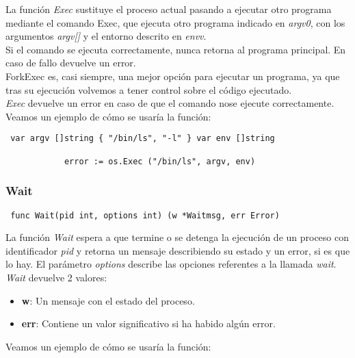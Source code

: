		La función \textit{Exec} sustituye el proceso actual pasando a ejecutar
		otro programa mediante el comando Exec, que ejecuta otro programa
		indicado en \textit{argv0}, con los argumentos \textit{argv[]} y el
		entorno descrito en \textit{envv}.\\
		
		Si el comando se ejecuta correctamente, nunca retorna al programa
		principal. En caso de fallo devuelve un error.\\
		
		ForkExec es, casi siempre, una mejor opción para ejecutar un programa,
		ya que tras su ejecución volvemos a tener control sobre el código
		ejecutado.\\
		
		\textit{Exec} devuelve un error en caso de que el comando nose ejecute
		correctamente.\\
		
		Veamos un ejemplo de cómo se usaría la función:
		
		\begin{verbatim} var argv []string { "/bin/ls", "-l" } var env []string
		
			error := os.Exec ("/bin/ls", argv, env) \end{verbatim}
		
		\subsubsection{Wait}

		\begin{verbatim} func Wait(pid int, options int) (w *Waitmsg, err Error)
		\end{verbatim}
				
		La función \textit{Wait} espera a que termine o se detenga la ejecución
		de un proceso con identificador \textit{pid} y retorna un mensaje
		describiendo su estado y un error, si es que lo hay. El parámetro
		\textit{options} describe las opciones referentes a la llamada
		\textit{wait}.\\
		
		\textit{Wait} devuelve 2 valores: \begin{itemize} \item \textbf{w}: Un
		mensaje con el estado del proceso.  \item \textbf{err}: Contiene un
		valor significativo si ha habido algún error.  \end{itemize}
		
		Veamos un ejemplo de cómo se usaría la función:
		

